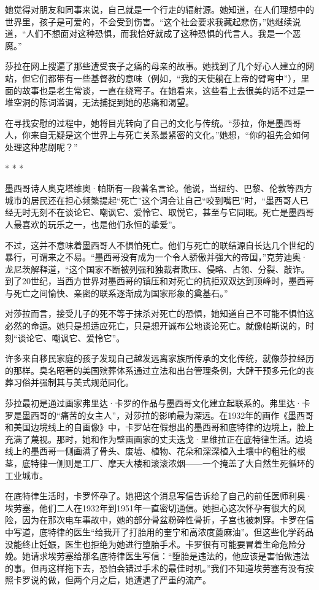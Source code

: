 \documentclass[12pt,oneside]{book}
\begin{document}
\begin{bookref}[frametitle={\cite{好好告别}}]
她觉得对朋友和同事来说，自己就是一个行走的辐射源。她知道，在人们理想中的世界里，孩子是可爱的，不会受到伤害。“这个社会要求我藏起悲伤，”她继续说道，“人们不想面对这种恐惧，而我恰好就成了这种恐惧的代言人。我是一个恶魔。”

莎拉在网上搜遍了那些遭受丧子之痛的母亲的故事。她找到了几个好心人建立的网站，但它们都带有一些基督教的意味（例如，“我的天使躺在上帝的臂弯中”），里面的故事也是老生常谈，一直在绕弯子。在她看来，这些看上去很美的话不过是一堆空洞的陈词滥调，无法捕捉到她的悲痛和渴望。

在寻找安慰的过程中，她将目光转向了自己的文化与传统。“莎拉，你是墨西哥人，你来自无疑是这个世界上与死亡关系最紧密的文化。”她想，“你的祖先会如何处理这种悲剧呢？”
\begin{center}
* * *
\end{center}
墨西哥诗人奥克塔维奥·帕斯有一段著名言论。他说，当纽约、巴黎、伦敦等西方城市的居民还在担心频繁提起“死亡”这个词会让自己“咬到嘴巴”时，“墨西哥人已经无时无刻不在谈论它、嘲讽它、爱怜它、取悦它，甚至与它同眠。死亡是墨西哥人最喜欢的玩乐之一，也是他们永恒的挚爱”。

不过，这并不意味着墨西哥人不惧怕死亡。他们与死亡的联结源自长达几个世纪的暴行，可谓来之不易。“墨西哥没有成为一个令人骄傲并强大的帝国，”克劳迪奥·龙尼茨解释道，“这个国家不断被列强和独裁者欺压、侵略、占领、分裂、敲诈。到了20世纪，当西方世界对墨西哥的镇压和对死亡的抗拒双双达到顶峰时，墨西哥与死亡之间愉快、亲密的联系逐渐成为国家形象的奠基石。”

对莎拉而言，接受儿子的死不等于抹杀对死亡的恐惧，她知道自己不可能不惧怕这必然的命运。她只是想适应死亡，只是想开诚布公地谈论死亡。就像帕斯说的，时刻“谈论它、嘲讽它、爱怜它”。

许多来自移民家庭的孩子发现自己越发远离家族所传承的文化传统，就像莎拉经历的那样。臭名昭著的美国殡葬体系通过立法和出台管理条例，大肆干预多元化的丧葬习俗并强制其与美式规范同化。

莎拉最初是通过画家弗里达·卡罗的作品与墨西哥文化建立起联系的。弗里达·卡罗是墨西哥的“痛苦的女主人”，对莎拉的影响最为深远。在1932年的画作《墨西哥和美国边境线上的自画像》中，卡罗站在假想出的墨西哥和底特律的边境上，脸上充满了蔑视。那时，她和作为壁画画家的丈夫迭戈·里维拉正在底特律生活。边境线上的墨西哥一侧画满了骨头、废墟、植物、花朵和深深植入土壤中的粗壮的根茎，底特律一侧则是工厂、摩天大楼和滚滚浓烟——一个掩盖了大自然生死循环的工业城市。

在底特律生活时，卡罗怀孕了。她把这个消息写信告诉给了自己的前任医师利奥·埃劳塞，他们二人在1932年到1951年一直密切通信。她担心这次怀孕有很大的风险，因为在那次电车事故中，她的部分骨盆粉碎性骨折，子宫也被刺穿。卡罗在信中写道，底特律的医生“给我开了打胎用的奎宁和高浓度蓖麻油”。但这些化学药品没能终止妊娠，医生也拒绝为她进行堕胎手术。卡罗很有可能要冒着生命危险分娩。她请求埃劳塞给那名底特律医生写信：“堕胎是违法的，他应该是害怕做违法的事。但再这样拖下去，恐怕会错过手术的最佳时机。”我们不知道埃劳塞有没有按照卡罗说的做，但两个月之后，她遭遇了严重的流产。


\end{bookref}
\end{document}
